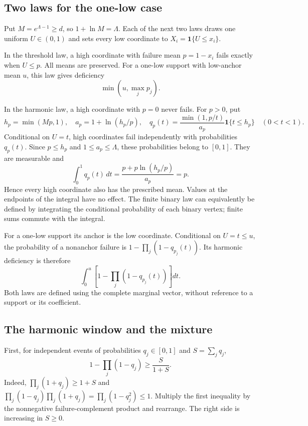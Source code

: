 \documentclass[11pt]{article}
\theoremstyle{remark}
\newcommand{\ind}{\mathbf 1}
\begin{document}
\subsection{Two laws for the one-low case}
Put $M=e^{\Lambda-1}\ge d$, so $1+\ln M=\Lambda$. Each of the next two
laws draws one uniform $U\in(0,1)$ and sets every low coordinate to
$X_i=\ind\{U\le x_i\}$.

In the threshold law, a high coordinate with failure mean $p=1-x_i$
fails exactly when $U\le p$. All means are preserved. For a one-low
support with low-anchor mean $u$, this law gives deficiency
\begin{equation}\label{eq:threshold-gain}
 \min\left(u,\max_jp_j\right).
\end{equation}

In the harmonic law, a high coordinate with $p=0$ never fails. For
$p>0$, put
\begin{equation}\label{eq:harmonic-density}
 h_p=\min(Mp,1),\quad a_p=1+\ln(h_p/p),\quad
 q_p(t)=\frac{\min(1,p/t)}{a_p}\ind\{t\le h_p\}
       \quad(0<t<1).
\end{equation}
Conditional on $U=t$, high coordinates fail independently with
probabilities $q_p(t)$. Since $p\le h_p$ and $1\le a_p\le\Lambda$,
these probabilities belong to $[0,1]$. They are measurable and
\begin{equation}\label{eq:density-integral}
 \int_0^1q_p(t)\,dt
 =\frac{p+p\ln(h_p/p)}{a_p}=p.
\end{equation}
Hence every high coordinate also has the prescribed mean. Values at
the endpoints of the integral have no effect. The finite binary law
can equivalently be defined by integrating the conditional probability
of each binary vertex; finite sums commute with the integral.

For a one-low support its anchor is the low coordinate. Conditional
on $U=t\le u$, the probability of a nonanchor failure is
$1-\prod_j(1-q_{p_j}(t))$. Its harmonic deficiency is therefore
\begin{equation}\label{eq:harmonic-deficiency}
 \int_0^u\left[1-\prod_j(1-q_{p_j}(t))\right]dt.
\end{equation}
Both laws are defined using the complete marginal vector, without
reference to a support or its coefficient.

\subsection{The harmonic window and the mixture}
First, for independent events of probabilities $q_j\in[0,1]$ and
$S=\sum_jq_j$,
\begin{equation}\label{eq:rational-union}
 1-\prod_j(1-q_j)\ge\frac{S}{1+S}.
\end{equation}
Indeed, $\prod_j(1+q_j)\ge1+S$ and
$\prod_j(1-q_j)\prod_j(1+q_j)=\prod_j(1-q_j^2)\le1$.
Multiply the first inequality by the nonnegative failure-complement
product and rearrange. The right side is increasing in $S\ge0$.
\end{document}
